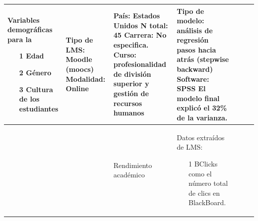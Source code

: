 \documentclass[spanish]{textolivre}
\begin{document}
\begin{small}
\begin{longtable}{
    >{\raggedright\arraybackslash}p{}
    p{}
    p{}
    p{}
    p{}
    p{}
    p{}
    }
Variables demográficas para la
\begin{itemize}
\item[1] Edad
\item[2] Género
\item[3] Cultura de los estudiantes	
\end{itemize} & Tipo de LMS: Moodle (moocs) \newline Modalidad: Online & País: Estados Unidos \newline N total: 45 \newline Carrera: No especifica. \newline Curso: profesionalidad de división superior y gestión de recursos humanos	& Tipo de modelo: análisis de regresión pasos hacia atrás (stepwise backward) \newline Software: SPSS \newline El modelo final explicó el 32\% de la varianza.
\\
\midrule
11 & \cite{tempelaar2020} & Rendimiento académico & Datos extraídos de LMS:
\begin{itemize}
\item[1] BClicks como el número total de clics en BlackBoard.
\end{itemize}


\end{longtable}
\end{small}
\end{document}

